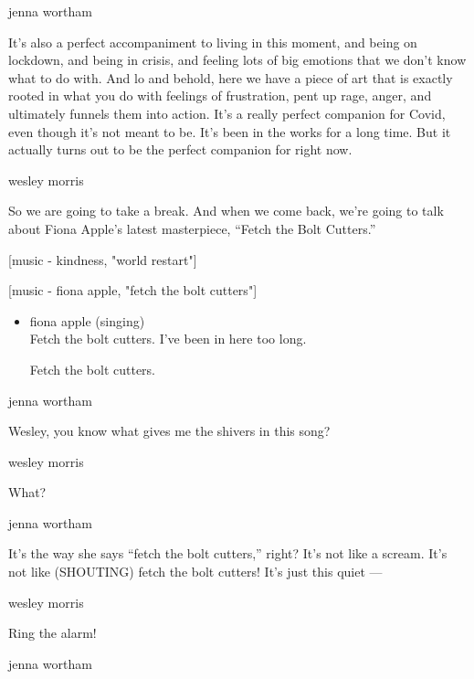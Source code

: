 jenna wortham

It's also a perfect accompaniment to living in this moment, and being on
lockdown, and being in crisis, and feeling lots of big emotions that we
don't know what to do with. And lo and behold, here we have a piece of
art that is exactly rooted in what you do with feelings of frustration,
pent up rage, anger, and ultimately funnels them into action. It's a
really perfect companion for Covid, even though it's not meant to be.
It's been in the works for a long time. But it actually turns out to be
the perfect companion for right now.

wesley morris

So we are going to take a break. And when we come back, we're going to
talk about Fiona Apple's latest masterpiece, ``Fetch the Bolt Cutters.''

{[}music - kindness, "world restart"{]}

{[}music - fiona apple, "fetch the bolt cutters"{]}

\begin{itemize}
\item
  fiona apple (singing)\\
  Fetch the bolt cutters. I've been in here too long.

  Fetch the bolt cutters.
\end{itemize}

jenna wortham

Wesley, you know what gives me the shivers in this song?

wesley morris

What?

jenna wortham

It's the way she says ``fetch the bolt cutters,'' right? It's not like a
scream. It's not like (SHOUTING) fetch the bolt cutters! It's just this
quiet ---

wesley morris

Ring the alarm!

jenna wortham

